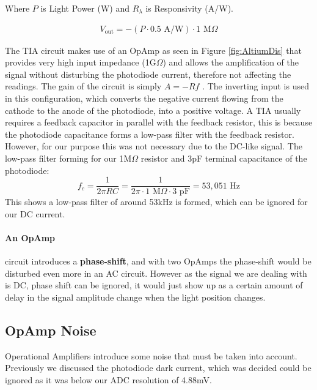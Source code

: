 Where $P$ is Light Power (W) and $R_{\lambda}$ is Responsivity (A/W).

\begin{equation} \label{eq:TIAoutputWithValues}
  \begin{split}
  V_{\text{out}} = -(P \cdot 0.5 \text{ A/W}) \cdot 1 \text{ M}\Omega
  \end{split}
\end{equation}

The \ac{TIA} circuit makes use of an \ac{OpAmp} as seen in Figure \ref{fig:AltiumDis} that provides very high input impedance (1G$\Omega$) and allows the amplification of the signal without disturbing the photodiode current, therefore not affecting the readings. The gain of the circuit is simply $A=-Rf$ \cite[p.535]{RefWorks:horowitz2015theart}. The inverting input is used in this configuration, which converts the negative current flowing from the cathode to the anode of the photodiode, into a positive voltage. A \ac{TIA} usually requires a feedback capacitor in parallel with the feedback resistor, this is because the photodiode capacitance forms a low-pass filter with the feedback resistor. However, for our purpose this was not necessary due to the DC-like signal. The low-pass filter forming for our 1M$\Omega$ resistor and 3pF terminal capacitance of the photodiode:
\begin{equation} \label{eq:LPfilterCRf}
f_c = \frac{1}{2\pi RC} = \frac{1}{2\pi \cdot 1\text{ M}\Omega \cdot 3\text{ pF}} = 53,051\text{ Hz}
\end{equation}
This shows a low-pass filter of around 53kHz is formed, which can be ignored for our DC current.
\paragraph{An \ac{OpAmp}} circuit introduces a \textbf{phase-shift}, and with two \acp{OpAmp} the phase-shift would be disturbed even more in an AC circuit. However as the signal we are dealing with is DC, phase shift can be ignored, it would just show up as a certain amount of delay in the signal amplitude change when the light position changes.

\subsection{OpAmp Noise}
Operational Amplifiers introduce some noise that must be taken into account. Previously we discussed the photodiode dark current, which was decided could be ignored as it was below our ADC resolution of 4.88mV.

